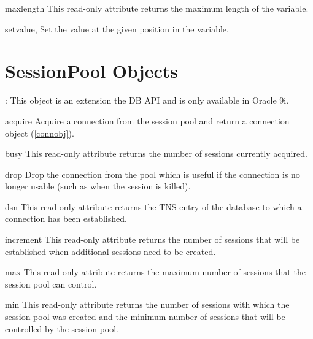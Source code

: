 \documentclass{manual}
\begin{document}
\begin{datadesc}{maxlength}
  This read-only attribute returns the maximum length of the variable.
\end{datadesc}

\begin{funcdesc}{setvalue}{, }
  Set the value at the given position in the variable.
\end{funcdesc}

\chapter{SessionPool Objects\label{sesspool}}

: This object is an extension the DB API and is only available in
Oracle 9i.

\begin{funcdesc}{acquire}{}
  Acquire a connection from the session pool and return a connection
  object (\ref{connobj}).
\end{funcdesc}

\begin{datadesc}{busy}
  This read-only attribute returns the number of sessions currently acquired.
\end{datadesc}

\begin{funcdesc}{drop}{}
  Drop the connection from the pool which is useful if the connection is no
  longer usable (such as when the session is killed).
\end{funcdesc}

\begin{datadesc}{dsn}
  This read-only attribute returns the TNS entry of the database to which a
  connection has been established.
\end{datadesc}

\begin{datadesc}{increment}
  This read-only attribute returns the number of sessions that will be
  established when additional sessions need to be created.
\end{datadesc}

\begin{datadesc}{max}
  This read-only attribute returns the maximum number of sessions that the
  session pool can control.
\end{datadesc}

\begin{datadesc}{min}
  This read-only attribute returns the number of sessions with which the
  session pool was created and the minimum number of sessions that will be
  controlled by the session pool.
\end{datadesc}
\end{document}
